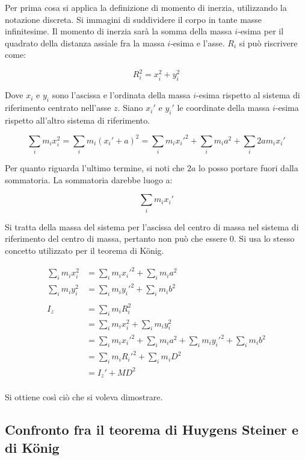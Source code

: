 Per prima cosa si applica la definizione di momento di inerzia, utilizzando la notazione discreta. Si immagini di suddividere il corpo in tante masse infinitesime. Il momento di inerzia sarà la somma della massa $i$-esima per il quadrato della distanza assiale fra la massa $i$-esima e l'asse. $R_i$ si può riscrivere come:

\[
	R_i^2 = x_i^2 + y_i^2
\]

Dove $x_i$ e $y_i$ sono l'ascissa e l'ordinata della massa $i$-esima rispetto al sistema di riferimento centrato nell'asse $z$. Siano $x_i'$ e $y_i'$ le coordinate della massa $i$-esima rispetto all'altro sistema di riferimento.

\[
	\sum_i m_i x_i^2  = \sum_i m_i (x_i'+a)^2 = \sum_i m_i x_i'^2 + \sum_i m_i a^2 + \sum_i 2 a m_i x_i'
\]

Per quanto riguarda l'ultimo termine, si noti che $2a$ lo posso portare fuori dalla sommatoria. La sommatoria darebbe luogo a:

\[
	\sum_i m_i x_i'
\]

Si tratta della massa del sistema per l'ascissa del centro di massa nel sistema di riferimento del centro di massa, pertanto non può che essere $0$. Si usa lo stesso concetto utilizzato per il teorema di K\"onig.

\begin{equation*}
	\begin{aligned}
		\sum_i m_i x_i^2 &= \sum_i m_i x_i'^2 + \sum_i m_i a^2 \\
		\sum_i m_i y_i^2 &= \sum_i m_i y_i'^2 + \sum_i m_i b^2 \\
		\\
		I_z &= \sum_i m_i R_i^2 \\
		&= \sum_i m_i x_i^2 + \sum_i m_i y_i^2 \\
		&=\sum_i m_i x_i'^2 + \sum_i m_i a^2 + \sum_i m_i y_i'^2 + \sum_i m_i b^2 \\
		&= \sum_i m_i R_i'^2 +\sum_i m_i D^2 \\
		&= I_z' + MD^2 \\
	\end{aligned}
\end{equation*}

Si ottiene così ciò che si voleva dimostrare.

\subsection{Confronto fra il teorema di Huygens Steiner e di K\"onig}

